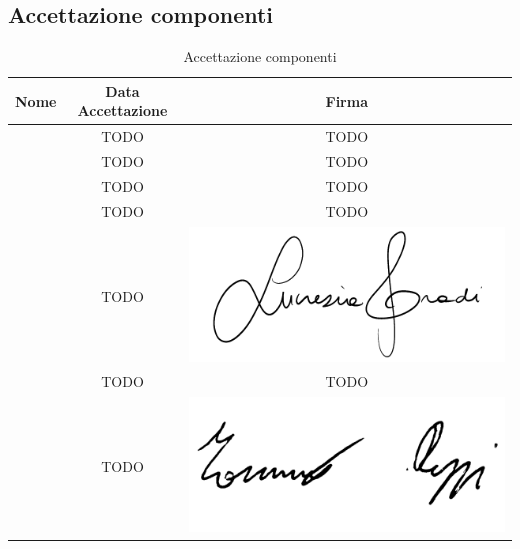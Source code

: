 \subsection{Accettazione componenti}

\renewcommand{\arraystretch}{1}
	\begin{table}[H]
		\begin{center}
			\setlength{\aboverulesep}{0pt}
			\setlength{\belowrulesep}{0pt}
			\setlength{\extrarowheight}{.75ex}
			\begin{tabular}{ c c c}
				\rowcolor{AzzurroGruppo!30} 
				\textbf{Nome} & \textbf{Data Accettazione} & \textbf{Firma} \\
				\toprule
				
				\Davide{} & TODO & TODO \\
                \Giosue{} & TODO & TODO \\
                \Francesco{} & TODO & TODO \\
                \Daniele{} & TODO & TODO \\
                \Lucrezia{} & TODO & \includegraphics[scale = 0.5]{components/img/firme_membri/firma-lg.png} \\
				\Matteo{} & TODO & TODO \\
                \Tommaso{} & TODO & \includegraphics[scale = 0.5]{components/img/firme_membri/firma-tp.png} \\
				
				\bottomrule
			\end{tabular}
			\caption{Accettazione componenti}
		\end{center}
    \end{table}

